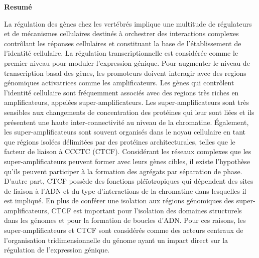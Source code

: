 \begin{center}
	\bfseries Resum\'e
\end{center}

	La r\'egulation des g\`enes chez les vert\'ebr\'es implique une multitude de r\'egulateurs et de m\'ecanismes cellulaires destin\'es \`a orchestrer des interactions complexes contr\^olant les r\'eponses cellulaires et constituant la base de l'\'etablissement de l'identit\'e cellulaire. La r\'egulation transcriptionnelle est consid\'er\'ee comme le premier niveau pour moduler l’expression g\'enique. Pour augmenter le niveau de transcription basal des g\`enes, les promoteurs doivent interagir avec des regions g\'enomiques activatrices comme les amplificateurs. Les g\`enes qui contr\^olent l'identit\'e cellulaire sont fr\'equemment associ\'es avec des regions tr\`es riches en amplificateurs, appel\'ees super-amplificateurs. Les super-amplificateurs sont tr\`es sensibles aux changements de concentration des prot\'eines qui leur sont li\'ees et ils pr\'esentent une haute inter-connectivit\'e au niveau de la chromatine. \'Egalement, les super-amplificateurs sont souvent organis\'es dans le noyau cellulaire en tant que r\'egions isol\'ees d\'elimit\'ees par des prot\'eines architecturales, telles que le facteur de liaison \`a CCCTC (CTCF). Consid\'erant les r\'eseaux complexes que les super-amplificateurs peuvent former avec leurs g\`enes cibles, il existe l’hypoth\`ese qu’ils peuvent participer \`a la formation des agr\'egats par s\'eparation de phase. D'autre part, CTCF poss\`ede des fonctions pl\'e\"iotropiques qui d\'ependent des sites de liaison \`a l’ADN et du type d'interactions de la chromatine dans lesquelles il est impliqu\'e. En plus de conf\'erer une isolation aux r\'egions g\'enomiques des super-amplificateurs, CTCF est important pour l’isolation des domaines structurels dans les g\'enomes et pour la formation de boucles d’ADN. Pour ces raisons, les super-amplificateurs et CTCF sont consid\'er\'es comme des acteurs centraux de l'organisation tridimensionnelle du g\'enome ayant un impact direct sur la r\'egulation de l'expression g\'enique.\\

